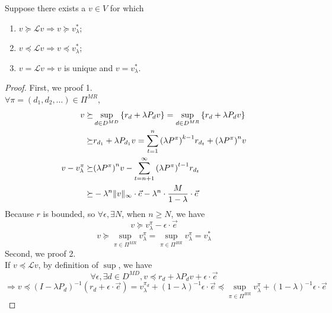 \begin{theorem}
    Suppose there exists a $ v \in V $ for which
    \begin{enumerate}
        \item $ v \succeq \mathcal{L} v \Rightarrow v \succeq v^*_\lambda $;
        \item $ v \preceq \mathcal{L} v \Rightarrow v \preceq v^*_\lambda$;
        \item $ v = \mathcal{L} v \Rightarrow v $ is unique and $ v = v^*_\lambda $.
    \end{enumerate}
    \begin{proof}
        First, we proof 1.\\
        $ \forall \pi = (d_1, d_2, \ldots) \in \Pi^{MR} $,
        \begin{align*}
            v \succeq& \sup_{d \in D^{MD}} \left\{ r_d + \lambda P_d v \right\} = \sup_{d \in D^{MR}} \left\{ r_d + \lambda P_d v \right\} \\
            \succeq& r_{d_1} + \lambda P_{d_1} v = \sum^{n}_{t=1} {(\lambda P^\pi)}^{k-1} r_{d_t} + {(\lambda P^\pi)}^n v\\
            v - v^\pi_\lambda \succeq& {(\lambda P^\pi)}^n v - \sum^{\infty}_{t = n+1} {(\lambda P^\pi)}^{t-1} r_{d_t} \\
            \succeq& - \lambda^n \Arrowvert v \Arrowvert_{\infty} \cdot \vec e
            - \lambda^n \cdot \frac{M}{1-\lambda} \cdot \vec e
        \end{align*}
        Because $ r $ is bounded, so $ \forall \epsilon, \exists N $, when $ n \ge N $, we have
        \[
            v \succeq v^\pi_\lambda - \epsilon \cdot \vec e
        \]
        \[
            v \succeq \sup_{\pi \in \Pi^{MR}} v^\pi_\lambda = \sup_{\pi \in \Pi^{HR}} v^\pi_\lambda = v^*_\lambda
        \]
        Second, we proof 2.\\
        If $ v \preceq \mathcal{L} v $, by definition of $ \sup $, we have
        \[
            \forall \epsilon, \exists d \in D^{MD}, v \preceq r_d + \lambda P_d v + \epsilon \cdot \vec e 
        \]
        \[
            \Rightarrow v \preceq {(I - \lambda P_d)}^{-1}(r_d + \epsilon \cdot \vec e)
        = v^{\pi_d}_{\lambda} + {(1 - \lambda)}^{-1} \epsilon \cdot \vec e
    \preceq \sup_{\pi \in \Pi^{HR}} v^\pi_{\lambda} + {(1-\lambda)}^{-1} \epsilon \cdot \vec e
        \]
    \end{proof}
\end{theorem}


